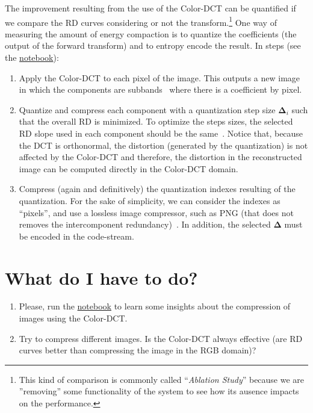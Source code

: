 The improvement resulting from the use of the Color-DCT can be
quantified if we compare the RD curves considering or not the
transform.\footnote{This kind of comparison is commonly called
``\emph{Ablation Study}'' because we are ''removing'' some
functionality of the system to see how its ausence impacts on the
performance.} One way of measuring the amount of energy compaction is
to quantize the coefficients (the output of the forward transform) and
to entropy encode the result. In steps (see the
\href{https://github.com/Sistemas-Multimedia/Sistemas-Multimedia.github.io/blob/master/contents/color_DCT/RD_performance.ipynb}{notebook}):
\begin{enumerate}
\item Apply the Color-DCT to each pixel of the image. This outputs a
  new image in which the components are
  subbands~\cite{vruiz__transform_coding} where there is a coefficient
  by pixel.
\item Quantize and compress each component with a quantization step
  size ${\mathbf\Delta}_i$ such that the overall RD is minimized. To
  optimize the steps sizes, the selected RD slope used in each
  component should be the same~\cite{vetterli2014foundations}. Notice that,
  because the DCT is orthonormal, the distortion (generated by the
  quantization) is not affected by the Color-DCT and therefore, the
  distortion in the reconstructed image can be computed directly in
  the Color-DCT domain.
\item Compress (again and definitively) the quantization indexes
  resulting of the quantization. For the sake of simplicity, we can
  consider the indexes as ``pixels'', and use a lossless image
  compressor, such as PNG (that does not removes the intercomponent
  redundancy)~\cite{vruiz__PNG}. In addition, the selected
  ${\mathbf\Delta}$ must be encoded in the code-stream.
\end{enumerate}

\section{What do I have to do?}

\begin{enumerate}
\item Please, run the
  \href{https://github.com/Sistemas-Multimedia/Sistemas-Multimedia.github.io/blob/master/contents/color_DCT/RD_performance.ipynb}{notebook}
  to learn some insights about the compression of images using the Color-DCT.
\item Try to compress different images. Is the Color-DCT always
  effective (are RD curves better than compressing the image in
  the RGB domain)?
\end{enumerate}

